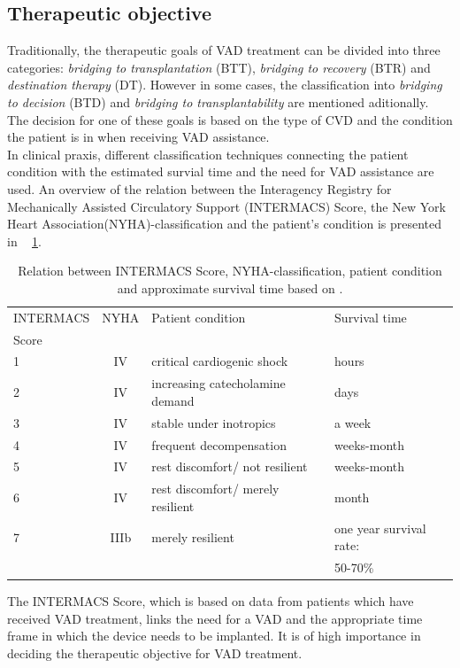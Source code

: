 \subsection{Therapeutic objective}
Traditionally, the therapeutic goals of VAD treatment can be divided into three categories: \textit{bridging to transplantation} (BTT), \textit{bridging to recovery} (BTR) and \textit{destination therapy} (DT). However in some cases, the classification into \textit{bridging to decision} (BTD) and \textit{bridging to transplantability} are mentioned aditionally. The decision for one of these goals is based on the type of CVD and the condition the patient is in when receiving VAD assistance. \cite{VAD6}
\\In clinical praxis, different classification techniques connecting the patient condition with the estimated survial time and the need for VAD assistance are used. An overview of the relation between the Interagency Registry for Mechanically Assisted Circulatory Support (INTERMACS) Score, the New York Heart Association(NYHA)-classification and the patient's condition is presented in \tablename~ \ref{tab:Table1}.
\begin{table}[ht]
  \begin{tabularx}{\textwidth}{l|c|l|l}
    \toprule
    INTERMACS & NYHA & Patient condition & Survival time  \\
    Score & & &\\
    \midrule
    1 & IV & critical cardiogenic shock & hours \\
    2 & IV & increasing catecholamine demand & days \\
    3 & IV & stable under inotropics & a week \\
    4 & IV & frequent decompensation & weeks-month \\
    5 & IV & rest discomfort/ not resilient & weeks-month \\
    6 & IV & rest discomfort/ merely resilient & month \\
    7 & IIIb & merely resilient & one year survival rate: \\
     & & & 50-70\% \\
     \bottomrule
  \end{tabularx}
  \caption[Relation between INTERMACS Score and NYHA-classification]{Relation between INTERMACS Score, NYHA-classification, patient condition and approximate survival time based on \cite{VAD5}.}
  \label{tab:Table1}
\end{table}
The INTERMACS Score, which is based on data from patients which have received VAD treatment, links the need for a VAD and the appropriate time frame in which the device needs to be implanted. It is of high importance in deciding the therapeutic objective for VAD treatment. \cite{VAD7}
